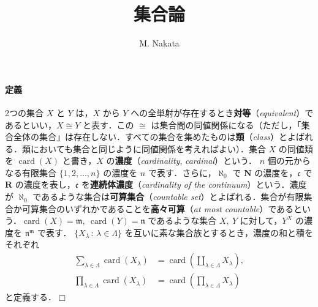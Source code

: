 \documentclass[pandoc,base=10pt,b5j,precisetext]{bxjsarticle}
\title{集合論}
\author{M. Nakata}
\date{}
\let\oldparagraph\paragraph
\renewcommand{\paragraph}[1]{\oldparagraph{#1}\mbox{}}
\begin{document}
\maketitle

{
\setcounter{tocdepth}{3}
\tableofcontents
}
\newcommand{\deli}{\,:\,}
\newcommand{\bb}[1]{\boldsymbol{#1}}
\renewcommand{\i}{\mathrm{i}}
\renewcommand{\bar}[1]{\overline{#1}}
\renewcommand{\le}{\leqslant}
\renewcommand{\ge}{\geqslant}
\newcommand{\qset}[2]{{#1}/\!\,{#2}}
\newcommand{\scr}[1]{\mathscr{#1}}
\renewcommand{\cal}[1]{\mathcal{#1}}
\newcommand{\pfrac}[2]{\frac{\partial #1}{\partial #2}}
\newcommand{\card}{\mathop{\mathrm{card}}\nolimits}
\newcommand{\Span}{\mathop{\mathrm{span}}}
\newcommand{\obj}{\mathop{\mathrm{obj}}}
\newcommand{\Hom}{\mathop{\mathrm{Hom}}}

\hypertarget{ux5b9aux7fa9}{%
\paragraph{定義}\label{ux5b9aux7fa9}}

2つの集合 \(X\) と \(Y\) は，\(X\) から \(Y\)
への全単射が存在するとき\textbf{対等}（\emph{equivalent}）であるといい，\(X \cong Y\)
と表す．この \(\cong\)
は集合間の同値関係になる（ただし，「集合全体の集合」は存在しない．すべての集合を集めたものは\textbf{類}（\emph{class}）とよばれる．類においても集合と同じように同値関係を考えればよい）．集合
\(X\) の同値類を \(\card(X)\) と書き，\(X\)
の\textbf{濃度}（\emph{cardinality}, \emph{cardinal}）という． \(n\)
個の元からなる有限集合 \(\{1, 2, \dotsc, n \}\) の濃度を \(n\)
で表す．さらに，\(\aleph_0\) で \(\bb N\) の濃度を，\(\mathfrak c\) で
\(\bb R\) の濃度を表し，\(\mathfrak c\)
を\textbf{連続体濃度}（\emph{cardinality of the
continuum}）という．濃度が \(\aleph_0\)
であるような集合は\textbf{可算集合}（\emph{countable
set}）とよばれる．集合が有限集合か可算集合のいずれかであることを\textbf{高々可算}（\emph{at
most
countable}）であるという．\(\card(X) = \mathfrak m,\ \card(Y) = \mathfrak n\)
であるような集合 \(X,\ Y\) に対して，\(Y^X\) の濃度を
\(\mathfrak n^{\mathfrak m}\) で表す．
\(\{ X_\lambda \deli \lambda \in \Lambda \}\)
を互いに素な集合族とするとき，濃度の和と積をそれぞれ \begin{align*}
\sum_{\lambda \in \Lambda} \card(X_\lambda) &= \card(\coprod_{\lambda \in \Lambda} X_\lambda),\\
\prod_{\lambda \in \Lambda} \card(X_\lambda) &= \card(\prod_{\lambda \in \Lambda} X_\lambda)
\end{align*} と定義する．\(\Box\)
\end{document}
